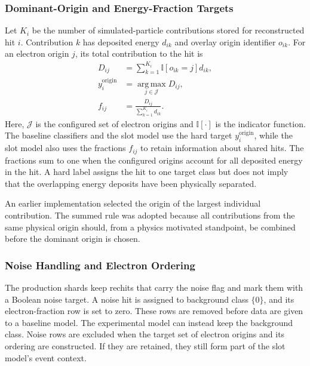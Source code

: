 \subsubsection{Dominant-Origin and Energy-Fraction Targets}

Let \(K_i\) be the number of simulated-particle contributions stored for
reconstructed hit \(i\). Contribution \(k\) has deposited energy \(d_{ik}\)
and overlay origin identifier \(o_{ik}\). For an electron origin \(j\), its
total contribution to the hit is
\begin{align}
    D_{ij}
    &=
    \sum_{k=1}^{K_i}
    \mathbb{I}\!\left[o_{ik}=j\right]d_{ik}, \\
    y_i^{\mathrm{origin}}
    &=
    \operatorname*{arg\,max}_{j\in\mathcal{J}}D_{ij},
    \label{eq:dominant_origin_target}\\
    f_{ij}
    &=
    \frac{D_{ij}}{\sum_{k=1}^{K_i}d_{ik}} .
    \label{eq:origin_fraction_target}
\end{align}
Here, \(\mathcal{J}\) is the configured set of electron origins and
\(\mathbb{I}[\cdot]\) is the indicator function. The baseline classifiers and
the slot model use the hard target \(y_i^{\mathrm{origin}}\), while the slot
model also uses the fractions \(f_{ij}\) to retain information about shared
hits. The fractions sum to one when the configured origins account for all
deposited energy in the hit. A hard label assigns the hit to one target class
but does not imply that the overlapping energy deposits have been physically
separated.

An earlier implementation selected the origin of the largest individual
contribution. The summed rule was adopted because all contributions from the
same physical origin should, from a physics motivated standpoint, be combined before the dominant origin is chosen.

\subsubsection{Noise Handling and Electron Ordering}

The production shards keep \gls{rechit}s that carry the noise flag and mark them
with a Boolean noise target. A noise hit is assigned to background class
\(\{0\}\), and its electron-fraction row is set to zero. These rows are removed
before data are given to a baseline model. The experimental model can instead keep
the background class. Noise rows are excluded when the target set of electron
origins and its ordering are constructed. If they are retained, they still
form part of the slot model's event context.

